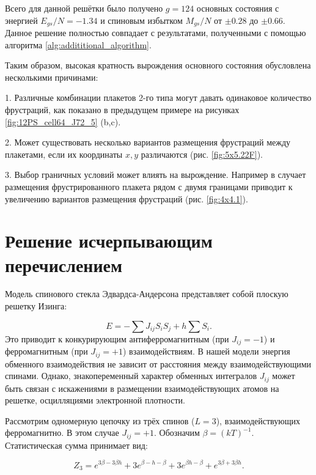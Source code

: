 \documentclass[utf8, babel, sor, jor, amsmath, amssymb, reprint]{elsarticle} %
\begin{document}
Всего для данной решётки было получено $g=124$ основных состояния с энергией $E_{gs}/N=-1.34$ и спиновым избытком $M_{gs}/N$ от $\pm 0.28$ до $\pm 0.66$. Данное решение полностью совпадает с результатами, полученными с помощью алгоритма \ref{alg:addititional_algorithm}.

Таким образом, высокая кратность вырождения основного состояния обусловлена несколькими причинами:

1. Различные комбинации плакетов 2-го типа могут давать одинаковое количество фрустраций, как показано в предыдущем примере на рисунках \ref{fig:12PS_cell64_J72_5} (b,c).

2. Может существовать несколько вариантов размещения фрустраций между плакетами, если их координаты $x,y$ различаются (рис. \ref{fig:5x5.22F}).

3. Выбор граничных условий может влиять на вырождение. Например в случает размещения фрустрированного плакета рядом с двумя границами приводит к увеличению вариантов размещения фрустраций (рис. \ref{fig:4x4.1}).



\section{Решение исчерпывающим перечислением}

Модель спинового стекла Эдвардса-Андерсона представляет собой плоскую решетку Изинга:

\begin{equation}
	E = -\sum J_{ij} S_i S_j + h \sum S_i.
	\label{eq:ising_energy}
\end{equation}
Это приводит к конкурирующим антиферромагнитным (при $J_{ij}=-1$) и ферромагнитным (при $J_{ij}=+1$) взаимодействиям. В нашей модели энергия обменного взаимодействия не зависит от расстояния между взаимодействующими спинами. Однако, знакопеременный характер обменных интегралов $J_{ij}$ может быть связан с искажениями в размещении взаимодействующих атомов на решетке, осцилляциями электронной плотности.

Рассмотрим одномерную цепочку из трёх спинов ($L=3$), взаимодействующих ферромагнитно.  В этом случае $J_{ij}=+1$.  Обозначим $\beta = (kT)^{-1}$.  Статистическая сумма принимает вид:

\begin{equation}
	Z_3 = e^{3\beta - 3\beta h} + 3e^{\beta - h - \beta} + 3e^{\beta h - \beta} + e^{3\beta + 3\beta h}.
	\label{eq:stat_3}
\end{equation}
\end{document}
